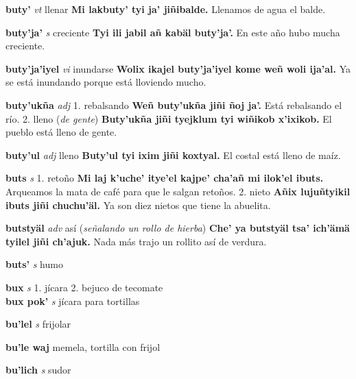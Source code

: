 \documentclass[10pt]{scrbook}
\newcommand{\entry}[1]{\textbf{#1}}
\newcommand{\onedefinition}[1]{#1.}
\newcommand{\partofspeech}[1]{\textit{#1}}
\newcommand{\spanishtranslation}[1]{#1}
\newcommand{\clarification}[1]{(\textit{#1})}
\newcommand{\cholexample}[1]{\textbf{#1}}
\newcommand{\exampletranslation}[1]{#1}
\newcommand{\secondaryentry}[1]{\\\textbf{#1}}
\newcommand{\secondpartofspeech}[1]{\textit{#1}}
\newcommand{\secondtranslation}[1]{#1}
\begin{document}
\begin{multicols}{2}
\entry{buty'}
\partofspeech{vt}
\spanishtranslation{llenar}
\cholexample{Mi lakbuty' tyi ja' jiñibalde.}
\exampletranslation{Llenamos de agua el balde.}

\entry{buty'ja'}
\partofspeech{s}
\spanishtranslation{creciente}
\cholexample{Tyi ili jabil añ kabäl buty'ja'.}
\exampletranslation{En este año hubo mucha creciente.}

\entry{buty'ja'iyel}
\partofspeech{vi}
\spanishtranslation{inundarse}
\cholexample{Wolix ikajel buty'ja'iyel kome weñ woli ija'al.}
\exampletranslation{Ya se está inundando porque está lloviendo mucho.}

\entry{buty'ukña}
\partofspeech{adj}
\onedefinition{1}
\spanishtranslation{rebalsando}
\cholexample{Weñ buty'ukña jiñi ñoj ja'.}
\exampletranslation{Está rebalsando el río.}
\onedefinition{2}
\spanishtranslation{lleno}
\clarification{de gente}
\cholexample{Buty'ukña jiñi tyejklum tyi wiñikob x'ixikob.}
\exampletranslation{El pueblo está lleno de gente.}

\entry{buty'ul}
\partofspeech{adj}
\spanishtranslation{lleno}
\cholexample{Buty'ul tyi ixim jiñi koxtyal.}
\exampletranslation{El costal está lleno de maíz.}

\entry{buts}
\partofspeech{s}
\onedefinition{1}
\spanishtranslation{retoño}
\cholexample{Mi laj k'uche' itye'el kajpe' cha'añ mi ilok'el ibuts.}
\exampletranslation{Arqueamos la mata de café para que le salgan retoños.}
\onedefinition{2}
\spanishtranslation{nieto}
\cholexample{Añix lujuñtyikil ibuts jiñi chuchu'äl.}
\exampletranslation{Ya son diez nietos que tiene la abuelita.}

\entry{butstyäl}
\partofspeech{adv}
\spanishtranslation{así}
\clarification{señalando un rollo de hierba}
\cholexample{Che' ya butstyäl tsa' ich'ämä tyilel jiñi ch'ajuk.}
\exampletranslation{Nada más trajo un rollito así de verdura.}

\entry{buts'}
\partofspeech{s}
\spanishtranslation{humo}

\entry{bux}
\partofspeech{s}
\onedefinition{1}
\spanishtranslation{jícara}
\onedefinition{2}
\spanishtranslation{bejuco de tecomate}
\secondaryentry{bux pok'}
\secondpartofspeech{s}
\secondtranslation{jícara para tortillas}

\entry{bu'lel}
\partofspeech{s}
\spanishtranslation{frijolar}

\entry{bu'le waj}
\spanishtranslation{memela, tortilla con frijol}

\entry{bu'lich}
\partofspeech{s}
\spanishtranslation{sudor}


\end{multicols}
\end{document}
